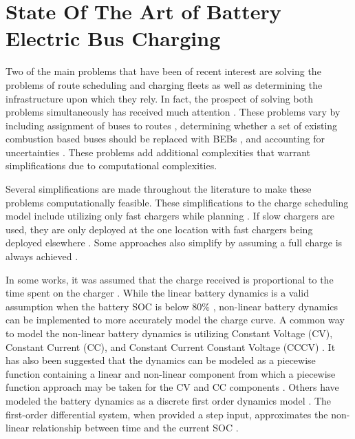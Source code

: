 \documentclass[ee,thesis]{usuthesis}
\begin{document}
\section{State Of The Art of Battery Electric Bus Charging}
\label{sec:state-of-the-art}
Two of the main problems that have been of recent interest are solving the problems of route scheduling and charging
fleets as well as determining the infrastructure upon which they rely. In fact, the prospect of solving both problems
simultaneously has received much attention \cite{wei-2018-optim-spatio,sebastiani-2016-evaluat-elect,hoke-2014-accoun-lithium,wang-2017-elect-vehic}. These problems vary by including assignment of buses to routes
\cite{rinaldi-2020-mixed-fleet,zhou-2020-collab-optim,tang-2019-robus-sched,li-2014-trans-bus}, determining
whether a set of existing combustion based buses should be replaced with BEBs \cite{zhou-2020-bi-objec,duan-2021-refor-mixed,rinaldi-2020-mixed-fleet,zhou-2020-collab-optim}, and accounting for uncertainties
\cite{bie-2021-optim-elect,duan-2021-refor-mixed,tang-2019-robus-sched,ursavas-2016-optim-polic}. These problems
add additional complexities that warrant simplifications due to computational complexities.

Several simplifications are made throughout the literature to make these problems computationally feasible. These
simplifications to the charge scheduling model include utilizing only fast chargers while planning
\cite{wei-2018-optim-spatio,sebastiani-2016-evaluat-elect,wang-2017-optim-rechar,zhou-2020-bi-objec,yang-2018-charg-sched,wang-2017-elect-vehic,qin-2016-numer-analy,liu-2020-batter-elect}. If slow chargers are used,
they are only deployed at the one location with fast chargers being deployed elsewhere
\cite{he-2020-optim-charg,tang-2019-robus-sched}. Some approaches also simplify by assuming a full charge is always
achieved \cite{wei-2018-optim-spatio,wang-2017-elect-vehic,zhou-2020-bi-objec,wang-2017-optim-rechar}.

In some works, it was assumed that the charge received is proportional to the time spent on the charger
\cite{liu-2020-batter-elect,yang-2018-charg-sched}. While the linear battery dynamics is a valid assumption when the
battery SOC is below 80\% \cite{liu-2020-batter-elect}, non-linear battery dynamics can be implemented to more accurately
model the charge curve. A common way to model the non-linear battery dynamics is utilizing Constant Voltage (CV),
Constant Current (CC), and Constant Current Constant Voltage (CCCV) \cite{abdollahi-2016-optim-batter,chen-2008-desig-grey}. It has also been suggested that the dynamics can be modeled as a piecewise function containing a
linear and non-linear component from which a piecewise function approach may be taken for the CV and CC components
\cite{zhang-2021-optim-elect,abdollahi-2016-optim-batter}. Others have modeled the battery dynamics as a discrete
first order dynamics model \cite{whitaker-2023-a-network}. The first-order differential system, when provided a step
input, approximates the non-linear relationship between time and the current SOC \cite{whitaker-2023-a-network}.
\end{document}
